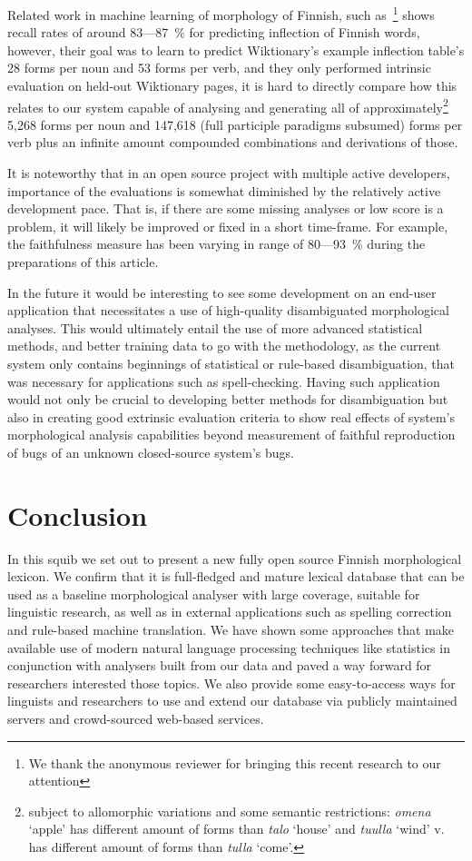 \documentclass[a4paper,12pt]{article}
\begin{document}
Related work in machine learning of morphology of Finnish, such
as~\cite{durrett2013supervised}\footnote{We thank the anonymous reviewer for
bringing this recent research to our attention} shows recall rates of around
83---87~\% for predicting inflection of Finnish words, however, their goal was
to learn to predict Wiktionary's example inflection table's 28 forms per noun
and 53 forms per verb, and they only performed intrinsic evaluation on held-out
Wiktionary pages, it is hard to directly compare how this relates to our system
capable of analysing and generating all of approximately\footnote{subject to
    allomorphic variations and some semantic restrictions: \emph{omena} `apple'
    has different amount of forms than \emph{talo} `house' and \emph{tuulla}
`wind' v. has different amount of forms than \emph{tulla} `come'.} 5,268 forms
per noun and 147,618 (full participle paradigms subsumed) forms per verb plus
an infinite amount compounded combinations and derivations of those.

It is noteworthy that in an open source project with multiple active
developers, importance of the evaluations is somewhat diminished by the
relatively active development pace. That is, if there are some missing analyses
or low score is a problem, it will likely be improved or fixed in a short
time-frame. For example, the faithfulness measure has been varying in range of
80---93~\% during the preparations of this article.

In the future it would be interesting to see some development on an end-user
application that necessitates a use of high-quality disambiguated morphological
analyses. This would ultimately entail the use of more advanced statistical
methods, and better training data to go with the methodology, as the current
system only contains beginnings of statistical or rule-based disambiguation,
that was necessary for applications such as spell-checking.  Having such
application would not only be crucial to developing better methods for
disambiguation but also in creating good extrinsic evaluation criteria to show
real effects of system's morphological analysis capabilities beyond measurement
of faithful reproduction of bugs of an unknown closed-source system's bugs.

\section{Conclusion}
\label{sec:conclusion}

In this squib we set out to present a new fully open source Finnish
morphological lexicon. We confirm that it is full-fledged and mature lexical
database that can be used as a baseline morphological analyser with large
coverage, suitable for linguistic research, as well as in external applications
such as spelling correction and rule-based machine translation. We have shown
some approaches that make available use of modern natural language processing
techniques like statistics in conjunction with analysers built from our data
and paved a way forward for researchers interested those topics. We also
provide some easy-to-access ways for linguists and researchers to use and
extend our database via publicly maintained servers and crowd-sourced web-based
services.
\end{document}
